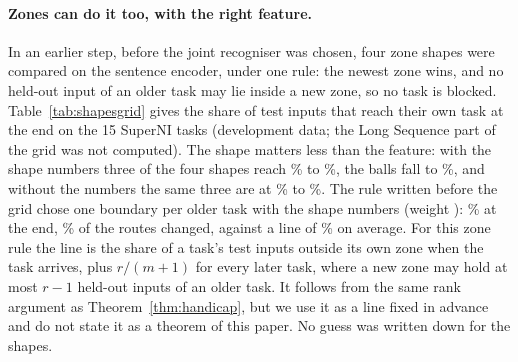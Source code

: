 \paragraph{Zones can do it too, with the right feature.} In an earlier step, before the joint recogniser was chosen, four zone shapes were compared on the sentence encoder, under one rule: the newest zone wins, and no held-out input of an older task may lie inside a new zone, so no task is blocked.
Table~\ref{tab:shapesgrid} gives the share of test inputs that reach their own task at the end on the 15 SuperNI tasks (development data; the Long Sequence part of the grid was not computed).
The shape matters less than the feature: with the shape numbers three of the four shapes reach \AudShapeOvrShapeEnd{}\% to \AudShapePairShapeEnd{}\%, the balls fall to \AudShapePairKnnShapeEnd{}\%, and without the numbers the same three are at \AudShapeOvrMiniEnd{}\% to \AudShapePairMiniEnd{}\%.
The rule written before the grid chose one boundary per older task with the shape numbers (weight \AudShapePairShapeWeight{}): \AudShapePairShapeEnd{}\% at the end, \AudShapePairShapeChanged{}\% of the routes changed, against a line of \AudShapePairShapeBound{}\% on average. For this zone rule the line is the share of a task's test inputs outside its own zone when the task arrives, plus $r/(m+1)$ for every later task, where a new zone may hold at most $r - 1$ held-out inputs of an older task. It follows from the same rank argument as Theorem~\ref{thm:handicap}, but we use it as a line fixed in advance and do not state it as a theorem of this paper.
No guess was written down for the shapes.

\begin{table}[t]
  \caption{Four shapes of zone, development data: the 15 SuperNI tasks, the sentence encoder alone or with the 16 shape numbers (the weight of the numbers is the best of those tried). Rows: one flat boundary against everything older, one flat boundary per older task, balls around the task's inputs, boundaries curved by random cosine features. Means over the tasks, in \%: test inputs given to their own task after the last task; test inputs whose route changed. Bold: the variant chosen by the rule written before the grid.}
  \label{tab:shapesgrid}
  \centering
  
\end{table}

